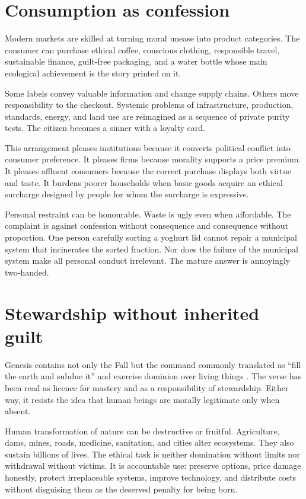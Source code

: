 \documentclass[12pt,a4paper]{book}
\begin{document}
\section{Consumption as confession}

Modern markets are skilled at turning moral unease into product categories.
The consumer can purchase ethical coffee, conscious clothing, responsible
travel, sustainable finance, guilt-free packaging, and a water bottle whose
main ecological achievement is the story printed on it.

Some labels convey valuable information and change supply chains.  Others move
responsibility to the checkout.  Systemic problems of infrastructure,
production, standards, energy, and land use are reimagined as a sequence of
private purity tests.  The citizen becomes a sinner with a loyalty card.

This arrangement pleases institutions because it converts political conflict
into consumer preference.  It pleases firms because morality supports a price
premium.  It pleases affluent consumers because the correct purchase displays
both virtue and taste.  It burdens poorer households when basic goods acquire
an ethical surcharge designed by people for whom the surcharge is expressive.

Personal restraint can be honourable.  Waste is ugly even when affordable.
The complaint is against confession without consequence and consequence
without proportion.  One person carefully sorting a yoghurt lid cannot repair
a municipal system that incinerates the sorted fraction.  Nor does the failure
of the municipal system make all personal conduct irrelevant.  The mature
answer is annoyingly two-handed.

\section{Stewardship without inherited guilt}

Genesis contains not only the Fall but the command commonly translated as
``fill the earth and subdue it'' and exercise dominion over living things
\cite[Gen.~1:28]{NRSVue2021}.  The verse has been read as licence for mastery
and as a responsibility of stewardship.  Either way, it resists the idea that
human beings are morally legitimate only when absent.

Human transformation of nature can be destructive or fruitful.  Agriculture,
dams, mines, roads, medicine, sanitation, and cities alter ecosystems.  They
also sustain billions of lives.  The ethical task is neither domination
without limits nor withdrawal without victims.  It is accountable use:
preserve options, price damage honestly, protect irreplaceable systems, improve
technology, and distribute costs without disguising them as the deserved
penalty for being born.
\end{document}

